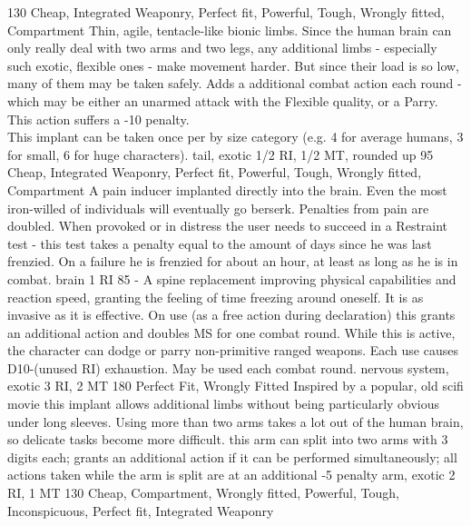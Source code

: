 \documentclass[12pt,a4paper,openany,usenames,dvipsnames]{book}
\begin{document}
        {130}
        {Cheap, Integrated Weaponry, Perfect fit, Powerful, Tough, Wrongly fitted, Compartment}
	    {Thin, agile, tentacle-like bionic limbs.
	    	Since the human brain can only really deal with two arms and two legs, any additional limbs
	    		- especially such exotic, flexible ones - make movement harder.
    		But since their load is so low, many of them may be taken safely.}
    	{Adds a additional combat action each round
    		- which may be either an unarmed attack with the Flexible quality,
    		or a Parry.
    		This action suffers a -10 penalty.
    		\\%
    	This implant can be taken once per by size category (e.g. 4 for average humans, 3 for small, 6 for huge characters).}
    	{tail, exotic}
    	{1/2 RI, 1/2 MT, rounded up}
    	{95}
    	{Cheap, Integrated Weaponry, Perfect fit, Powerful, Tough, Wrongly fitted, Compartment}
    	{A pain inducer implanted directly into the brain.
    		Even the most iron-willed of individuals will eventually go berserk.}
    	{Penalties from pain are doubled.
    		When provoked or in distress the user needs to succeed in a Restraint test
    		- this test takes a penalty equal to the amount of days since he was last frenzied.
    		On a failure he is frenzied for about an hour, at least as long as he is in combat.}
    	{brain}
    	{1 RI}
    	{85}
    	{-}
    	{A spine replacement improving physical capabilities and reaction speed,
    		granting the feeling of time freezing around oneself.
    		It is as invasive as it is effective.}
    	{On use (as a free action during declaration) this grants an additional action and doubles MS for one combat round.
    		While this is active, the character can dodge or parry non-primitive ranged weapons.
    		Each use causes D10-(unused RI) exhaustion.
    		May be used each combat round.}
    	{nervous system, exotic}
    	{3 RI, 2 MT}
    	{180}
    	{Perfect Fit, Wrongly Fitted}
        {Inspired by a popular, old scifi movie this implant allows additional limbs without being particularly obvious under long sleeves. Using more than two arms takes a lot out of the human brain, so delicate tasks become more difficult.}
        {this arm can split into two arms with 3 digits each; grants an additional action if it can be performed simultaneously; all actions taken while the arm is split are at an additional -5 penalty}
        {arm, exotic}
        {2 RI, 1 MT}
        {130}
        {Cheap, Compartment, Wrongly fitted, Powerful, Tough, Inconspicuous, Perfect fit, Integrated Weaponry}
\end{document}
